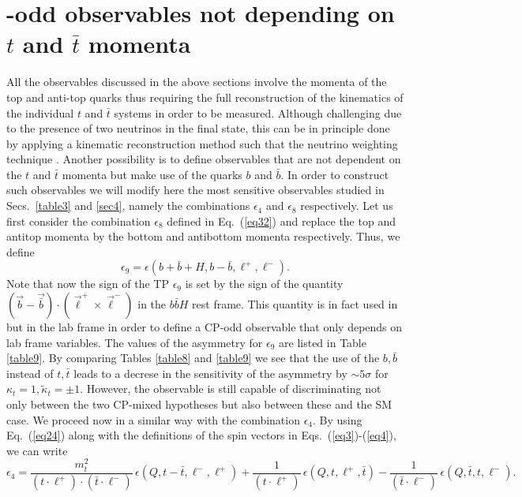\documentclass[aps,preprint,tightenlines,floatfix,superscriptaddress,nofootinbib,showpacs]{revtex4-1}
\def\beq{\begin{equation}}
\def\eeq{\end{equation}}
\def\tbar{\bar{t}}
\def\bbar{\bar{b}}
\def\kp{\kappa_t}
\def\kpt{\tilde{\kappa}_t}
\begin{document}
\section{{}-odd observables not depending on \MakeLowercase{{\boldmath $t$}} and \MakeLowercase{{\boldmath $\tbar$}} momenta}
\label{sec5}
All the observables discussed in the above sections involve the
momenta of the top and anti-top quarks thus requiring the full
reconstruction of the kinematics of the individual $t$ and $\tbar$
systems in order to be measured. Although challenging due to the
presence of two neutrinos in the final state, this can be in principle
done by applying a kinematic reconstruction method such that the
neutrino weighting technique \cite{atlasconf,atlascharge}. Another
possibility is to define observables that are not dependent on the $t$
and $\tbar$ momenta but make use of the quarks $b$ and $\bbar$. In
order to construct such observables we will modify here the most
sensitive observables studied in Secs.~\ref{table3} and \ref{sec4},
namely the combinations $\epsilon_4$ and $\epsilon_8$
respectively. Let us first consider the combination $\epsilon_8$
defined in Eq.~(\ref{eq32}) and replace the top and antitop momenta by
the bottom and antibottom momenta respectively. Thus, we define
%
\beq
\label{eq33}
\epsilon_9 = \epsilon(b+\bbar+H,b-\bbar,\ell^+,\ell^-).
\eeq
%
Note that now the sign of the TP $\epsilon_9$ is set by the sign of
the quantity $(\vec{b}-\vec{\bbar})\cdot(\vec{\ell}^+\!\times
\vec{\ell}^-)$ in the $b\bbar H$ rest frame. This quantity is in fact
used in \cite{Guadagnoli} but in the lab frame in order to define a
$\mathrm{CP}$-odd observable that only depends on lab frame
variables. The values of the asymmetry for $\epsilon_9$ are listed in
Table \ref{table9}. By comparing Tables \ref{table8} and \ref{table9}
we see that the use of the $b,\bbar$ instead of $t,\tbar$ leads to a
decrese in the sensitivity of the asymmetry by $\sim 5\sigma$ for
$\kp=1,\kpt=\pm 1$. However, the observable is still capable of
discriminating not only between the two $\mathrm{CP}$-mixed hypotheses
but also between these and the SM case.
We proceed now in a similar way with the combination $\epsilon_4$. By
using Eq.~(\ref{eq24}) along with the definitions of the spin vectors
in Eqs.~(\ref{eq3})-(\ref{eq4}), we can write
%
\beq
\label{eq34}
\epsilon_4 = \frac{m^2_t}{(t\cdot\ell^+)\cdot(\tbar\cdot\ell^-)}\,\epsilon(Q,t-\tbar,\ell^-,\ell^+)+\frac{1}{(t\cdot\ell^+)}\,\epsilon(Q,t,\ell^+,\tbar)-\frac{1}{(\tbar\cdot \ell^-)}\,\epsilon(Q,\tbar,t,\ell^-).
\eeq
\end{document}
